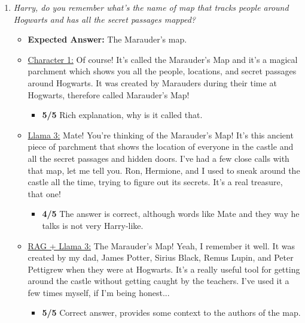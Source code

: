 \documentclass[fleqn,moreauthors,10pt]{ds_report}
\begin{document}
\begin{appendices}
\begin{enumerate}
                \item  \textit{Harry, do you remember what's the name of map that tracks people around Hogwarts and has all the secret passages mapped?}
                \begin{itemize}
                    \item \textbf{Expected Answer:} The Marauder's map. 
                    \item \underline{Character 1:} Of course! It's called the Marauder's Map and it's a magical parchment which shows you all the people, locations, and secret passages around Hogwarts. It was created by Marauders during their time at Hogwarts, therefore called Marauder's Map!
                    \begin{itemize}
                        \item \textbf{5/5} Rich explanation, why is it called that.
                    \end{itemize}        
                    \item \underline{Llama 3:} Mate! You're thinking of the Marauder's Map! It's this ancient piece of parchment that shows the location of everyone in the castle and all the secret passages and hidden doors. I've had a few close calls with that map, let me tell you. Ron, Hermione, and I used to sneak around the castle all the time, trying to figure out its secrets. It's a real treasure, that one!
                    \begin{itemize}
                        \item \textbf{4/5} The answer is correct, although words like Mate and they way he talks is not very Harry-like. 
                    \end{itemize}
                    \item \underline{RAG + Llama 3:} The Marauder's Map! Yeah, I remember it well. It was created by my dad, James Potter, Sirius Black, Remus Lupin, and Peter Pettigrew when they were at Hogwarts. It's a really useful tool for getting around the castle without getting caught by the teachers. I've used it a few times myself, if I'm being honest...
                    \begin{itemize}
                        \item \textbf{5/5} Correct answer, provides some context to the authors of the map.
                    \end{itemize}
                \end{itemize}


\end{enumerate}
\end{appendices}
\end{document}
